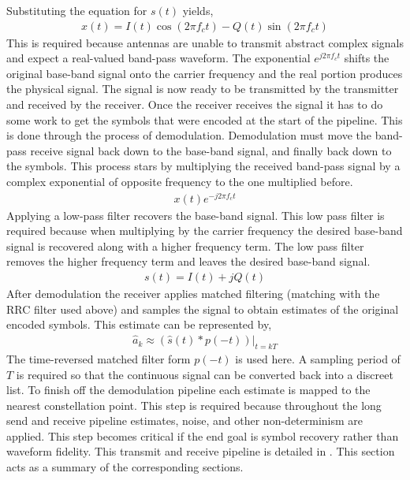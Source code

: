 \documentclass[conference]{IEEEtran}
\begin{document}
Substituting the equation for $s(t)$ yields,
\begin{align*}
    x(t) = I(t)\cos{(2\pi f_ct)} - Q(t)\sin{(2\pi f_ct)}
\end{align*}
This is required because antennas are unable to transmit abstract complex signals and expect a real-valued band-pass waveform. The exponential $e^{j2\pi f_ct}$ shifts the original base-band signal onto the carrier frequency and the real portion produces the physical signal. The signal is now ready to be transmitted by the transmitter and received by the receiver. Once the receiver receives the signal it has to do some work to get the symbols that were encoded at the start of the pipeline. This is done through the process of demodulation. Demodulation must move the band-pass receive signal back down to the base-band signal, and finally back down to the symbols. This process stars by multiplying the received band-pass signal by a complex exponential of opposite frequency to the one multiplied before.
\begin{align*}
    x(t)e^{-j2\pi f_ct}
\end{align*}
Applying a low-pass filter recovers the base-band signal. This low pass filter is required because when multiplying by the carrier frequency the desired base-band signal is recovered along with a higher frequency term. The low pass filter removes the higher frequency term and leaves the desired base-band signal.
\begin{align*}
    s(t) = I(t) + jQ(t)
\end{align*}
After demodulation the receiver applies matched filtering (matching with the RRC filter used above) and samples the signal to obtain estimates of the original encoded symbols. This estimate can be represented by,
\begin{align*}
    \hat{a}_k \approx (\hat{s}(t) * p(-t))|_{t=kT}
\end{align*}
The time-reversed matched filter form $p(-t)$ is used here. A sampling period of $T$ is required so that the continuous signal can be converted back into a discreet list. To finish off the demodulation pipeline each estimate is mapped to the nearest constellation point. This step is required because throughout the long send and receive pipeline estimates, noise, and other non-determinism are applied. This step becomes critical if the end goal is symbol recovery rather than waveform fidelity. This transmit and receive pipeline is detailed in \cite{sklar_digital_communications}. This section acts as a summary of the corresponding sections.
\end{document}
